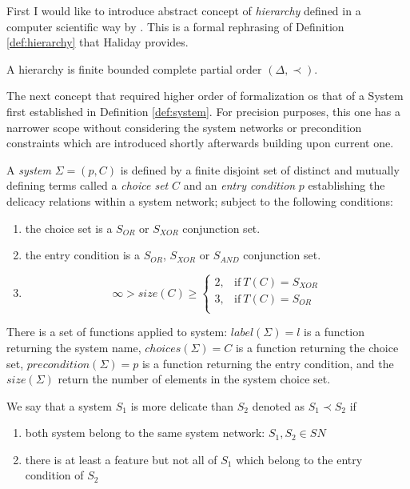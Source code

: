 First I would like to introduce abstract concept of \textit{hierarchy} defined in a computer scientific way by \citet{Pollard1987}. This is a formal rephrasing of Definition \ref{def:hierarchy} that Haliday provides.

\begin{definition}[Hierarchy]\label{def:hierarchy-cs}
	A hierarchy is finite bounded complete partial order $(\varDelta,\prec)$. 
\end{definition}

The next concept that required higher order of formalization os that of a System first established in Definition \ref{def:system}. For precision purposes, this one has a narrower scope without considering the system networks or precondition constraints which are introduced shortly afterwards building upon current one.

\begin{definition}[System]\label{def:formal-system}
A \textit{system} $\Sigma=(p,C)$ is defined by a finite disjoint set of distinct and mutually defining terms called a \textit{choice set} $C$ and an \textit{entry condition} $p$ establishing the delicacy relations within a system network; subject to the following conditions: 
\begin{enumerate}
	\item the choice set is a $S_{OR}$ or $S_{XOR}$ conjunction set.
	\item the entry condition is a $S_{OR}$, $S_{XOR}$ or $S_{AND}$ conjunction set.
	\item \begin{equation*}
	\infty > size(C) \geq
	\begin{cases}
	2, & \text{if}\ T(C) = S_{XOR} \\
	3, & \text{if}\ T(C) = S_{OR} \\
	\end{cases}
	\end{equation*}
\end{enumerate} 
\end{definition}

There is a set of functions applied to system: $label(\Sigma)=l$ is a function returning the system name, $choices(\Sigma)=C$ is a function returning the choice set, $precondition(\Sigma)=p$ is a function returning the entry condition, and the $size(\Sigma)$ return the number of elements in the system choice set.  

\begin{definition}\label{def:delicacy-hierarchy}
	We say that a system $S_{1}$ is more delicate than $S_{2}$ denoted as $S_{1} \prec S_{2}$ if 
	\begin{enumerate}
		\item both system belong to the same system network: $S_{1}, S_{2} \in SN$ 
		\item there is at least a feature but not all of $S_{1}$ which belong to the entry condition of $S_{2}$  
	\end{enumerate} 
\end{definition}

